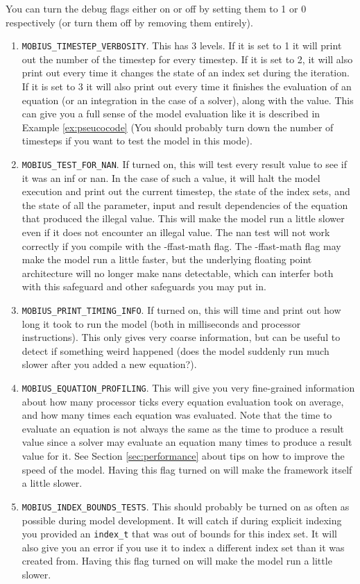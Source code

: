\documentclass[11pt]{article}
\theoremstyle{definition}
\begin{document}
You can turn the debug flags either on or off by setting them to 1 or 0 respectively (or turn them off by removing them entirely).

\begin{enumerate}[i]
\item {\tt MOBIUS\_TIMESTEP\_VERBOSITY}. This has 3 levels. If it is set to 1 it will print out the number of the timestep for every timestep. If it is set to 2, it will also print out every time it changes the state of an index set during the iteration. If it is set to 3 it will also print out every time it finishes the evaluation of an equation (or an integration in the case of a solver), along with the value. This can give you a full sense of the model evaluation like it is described in Example \ref{ex:pseucocode} (You should probably turn down the number of timesteps if you want to test the model in this mode).
\item {\tt MOBIUS\_TEST\_FOR\_NAN}. If turned on, this will test every result value to see if it was an inf or nan. In the case of such a value, it will halt the model execution and print out the current timestep, the state of the index sets, and the state of all the parameter, input and result dependencies of the equation that produced the illegal value. This will make the model run a little slower even if it does not encounter an illegal value. The nan test will not work correctly if you compile with the -ffast-math flag. The -ffast-math flag may make the model run a little faster, but the underlying floating point architecture will no longer make nans detectable, which can interfer both with this safeguard and other safeguards you may put in.
\item {\tt MOBIUS\_PRINT\_TIMING\_INFO}. If turned on, this will time and print out how long it took to run the model (both in milliseconds and processor instructions). This only gives very coarse information, but can be useful to detect if something weird happened (does the model suddenly run much slower after you added a new equation?).
\item {\tt MOBIUS\_EQUATION\_PROFILING}. This will give you very fine-grained information about how many processor ticks every equation evaluation took on average, and how many times each equation was evaluated. Note that the time to evaluate an equation is not always the same as the time to produce a result value since a solver may evaluate an equation many times to produce a result value for it. See Section \ref{sec:performance} about tips on how to improve the speed of the model. Having this flag turned on will make the framework itself a little slower.
\item {\tt MOBIUS\_INDEX\_BOUNDS\_TESTS}. This should probably be turned on as often as possible during model development. It will catch if during explicit indexing you provided an {\tt index\_t} that was out of bounds for this index set. It will also give you an error if you use it to index a different index set than it was created from. Having this flag turned on will make the model run a little slower.
\end{enumerate}
\end{document}
